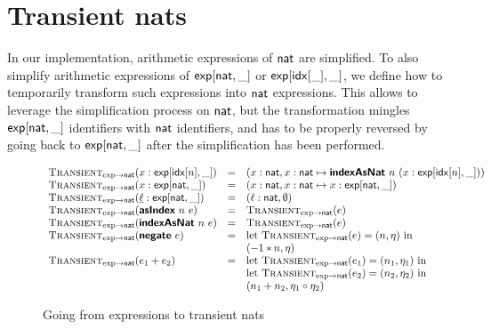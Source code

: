 \clearpage
\section{Transient nats}

\newcommand{\transientNatFromExpr}[1]{\textsc{Transient}_{\exp \to \natkind}(#1)}
\newcommand{\exprFromTransientNat}[1]{\textsc{Transient}_{\natkind \to \exp}(#1)}

In our implementation, arithmetic expressions of $\mathsf{nat}$ are simplified. To also simplify arithmetic expressions of $\mathsf{exp}[\mathsf{nat}, \_]$ or $\mathsf{exp}[\mathsf{idx}[\_], \_]$, we define how to temporarily transform such expressions into $\mathsf{nat}$ expressions. This allows to leverage the simplification process on $\mathsf{nat}$, but the transformation mingles $\mathsf{exp}[\mathsf{nat}, \_]$ identifiers with $\mathsf{nat}$ identifiers, and has to be properly reversed by going back to $\mathsf{exp}[\mathsf{nat}, \_]$ after the simplification has been performed.

\begin{figure}
  \begin{displaymath}
    \begin{array}{lcl}
      \transientNatFromExpr{\x : \tyexp{\tyidx[n]}{\_}} &=& (\x : \natkind, \x : \natkind \mapsto \prim{indexAsNat}~n~(\x : \tyexp{\tyidx[n]}{\_})) \\
      \transientNatFromExpr{\x : \tyexp{\natkind}{\_}} &=& (\x : \natkind, \x : \natkind \mapsto \x : \tyexp{\natkind}{\_}) \\
      \transientNatFromExpr{\underline{\ell} : \tyexp{\natkind}{\_}} &=& (\ell : \natkind, \emptyset) \\
      \transientNatFromExpr{\prim{asIndex}~n~e} &=& \transientNatFromExpr{e} \\
      \transientNatFromExpr{\prim{indexAsNat}~n~e} &=& \transientNatFromExpr{e} \\
      \transientNatFromExpr{\prim{negate}~e} &=&
        \text{let } \transientNatFromExpr{e} = (n, \eta) \text{ in} \\
        &&(-1 * n, \eta) \\
      \transientNatFromExpr{e_1 + e_2} &=&
        \text{let } \transientNatFromExpr{e_1} = (n_1, \eta_1) \text{ in} \\
        &&\text{let } \transientNatFromExpr{e_2} = (n_2, \eta_2) \text{ in} \\
        &&(n_1 + n_2, \eta_1 \circ \eta_2) \\
    \end{array}
  \end{displaymath}
  \caption{Going from expressions to transient nats}
\end{figure}

